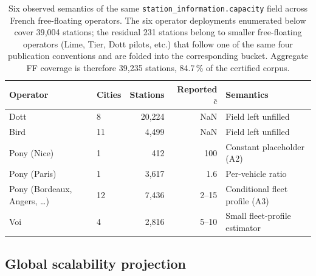 \documentclass[11pt,a4paper]{article}
\begin{document}
\begin{table}[!htbp]
\centering
\caption{Six observed semantics of the same
\texttt{station\_information.capacity} field across French
free-floating operators. The six operator deployments enumerated
below cover 39{,}004 stations; the residual 231 stations belong to
smaller free-floating operators (Lime, Tier, Dott pilots, etc.) that
follow one of the same four publication conventions and are folded
into the corresponding bucket. Aggregate FF coverage is therefore
39{,}235 stations, 84.7\,\% of the certified corpus.}
\label{tab:capacity-semantics}
\small
\begin{tabular}{@{}llrrl@{}}
\toprule
\textbf{Operator} & \textbf{Cities} & \textbf{Stations} & \textbf{Reported $\bar c$} & \textbf{Semantics}\\
\midrule
Dott         & 8  & 20{,}224 & NaN  & Field left unfilled \\
Bird         & 11 &  4{,}499 & NaN  & Field left unfilled \\
Pony (Nice)  & 1  &     412  & 100  & Constant placeholder (A2) \\
Pony (Paris) & 1  &  3{,}617 & 1.6  & Per-vehicle ratio \\
Pony (Bordeaux, Angers, \dots) & 12 &  7{,}436 & 2--15 & Conditional fleet profile (A3) \\
Voi          & 4  &  2{,}816 & 5--10 & Small fleet-profile estimator \\
\bottomrule
\end{tabular}
\end{table}

\subsection{Global scalability projection}\label{secGlobalAudit}
\end{document}
